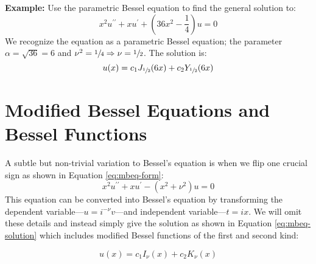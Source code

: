 \vspace{0.5cm}

\noindent\textbf{Example:} Use the parametric Bessel equation to find the general solution to:
\begin{equation*}
x^2u^{\prime \prime} + xu^{\prime} + \left(36x^2 - \frac{1}{4} \right)u = 0
\end{equation*}
We recognize the equation as a parametric Bessel equation; the parameter $\alpha = \sqrt{36} = 6$ and $\nu^2 = \sfrac{1}{4} \Rightarrow \nu = \sfrac{1}{2}$.  The solution is:
\begin{equation*}
u(x) = c_1 J_{\sfrac{1}{2}}(6x) + c_2Y_{\sfrac{1}{2}}(6x)
\end{equation*}

\section{Modified Bessel Equations and Bessel Functions}
A subtle but non-trivial variation to Bessel's equation is when we flip one crucial sign as shown in Equation \ref{eq:mbeq-form}:
\begin{equation}
x^2u^{\prime \prime} + xu^{\prime}-\left(x^2 + \nu^2\right)u = 0
\label{eq:mbeq-form}
\end{equation}
This equation can be converted into Bessel's equation by transforming the dependent variable---$u=i^{-\nu}v$---and independent variable---$t=ix$.  We will omit these details and instead simply give the solution as shown in Equation \ref{eq:mbeq-solution} which includes modified Bessel functions of the first and second kind:

\begin{equation}
u(x) = c_1I_{\nu}(x) + c_2K_{\nu}(x)
\label{eq:mbeq-solution}
\end{equation}

